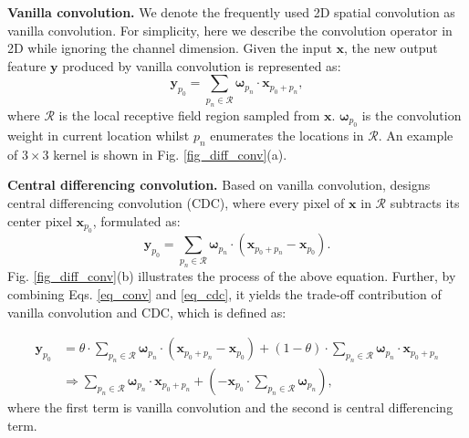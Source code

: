 \documentclass{article}
\begin{document}
\textbf{Vanilla convolution.} We denote the frequently used 2D spatial convolution as vanilla convolution. %
For simplicity, here we describe the convolution operator in 2D while ignoring the channel dimension. 
Given the input $\boldsymbol x$, the new output feature $\boldsymbol y$ produced by vanilla convolution is represented as: 
\begin{equation}\label{eq_conv}
\boldsymbol y_{p_0}=\sum_{p_n\in \mathcal{R}}{\boldsymbol \omega_{p_n} \cdot \boldsymbol x_{p_0 + p_n}},
\end{equation}
where $\mathcal{R}$ is the local receptive field region sampled from $\boldsymbol x$. $\boldsymbol \omega_{p_0}$ is the convolution weight in current location whilst $p_n$ enumerates the locations in $\mathcal{R}$. An example of $3\times 3$ kernel is shown in Fig. \ref{fig_diff_conv}(a). 

\textbf{Central differencing convolution.} Based on vanilla convolution, \cite{yu2020searching} designs central differencing convolution (CDC), where every pixel of $\boldsymbol x$ in $\mathcal{R}$ subtracts its center pixel $\boldsymbol x_{p_0}$, formulated as: %
\begin{equation}\label{eq_cdc}
\boldsymbol y_{p_0}=\sum_{p_n\in \mathcal{R}}{\boldsymbol \omega_{p_n} \cdot  \left( \boldsymbol x_{p_0 + p_n} - \boldsymbol x_{p_0} \right )}.
\end{equation}
Fig. \ref{fig_diff_conv}(b) illustrates the process of the above equation. Further, by combining Eqs. \ref{eq_conv} and \ref{eq_cdc}, it yields the trade-off contribution of vanilla convolution and CDC, which is defined as: 

\begin{equation}\label{eq_cdc_final}
\begin{split}
\boldsymbol y_{p_0}&=\theta \cdot \sum_{p_n\in \mathcal{R}}{\boldsymbol \omega_{p_n} \cdot  \left( \boldsymbol x_{p_0 + p_n} - \boldsymbol x_{p_0} \right )} 
+ \left( 1 - \theta \right ) \cdot \sum_{p_n\in \mathcal{R}}{\boldsymbol \omega_{p_n} \cdot  \boldsymbol x_{p_0 + p_n}}\\
&\Rightarrow \sum_{p_n\in \mathcal{R}}{\boldsymbol \omega_{p_n} \cdot \boldsymbol x_{p_0 + p_n}} + ( -\boldsymbol x_{p_0} \cdot \sum_{p_n\in \mathcal{R}}{\boldsymbol \omega_{p_n}} ), 
\end{split}
\end{equation}
where the first term is vanilla convolution and the second is central differencing term. 
\end{document}
